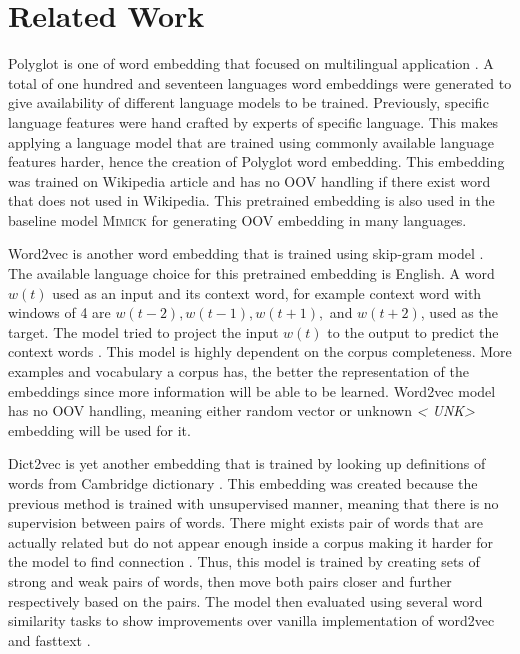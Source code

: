 \chapter{Related Work}
\label{chap:relatedwork}

Polyglot is one of word embedding that focused on multilingual
application \citep{polyglot2013alrfou}. A total of one hundred and
seventeen languages word embeddings were generated to give
availability of different language models to be trained. Previously,
specific language features were hand crafted by experts of specific
language\citep{polyglot2013alrfou}. This makes applying a language
model that are trained using commonly available language features
harder, hence the creation of Polyglot word embedding. This embedding
was trained on Wikipedia article and has no OOV handling if there
exist word that does not used in Wikipedia. This pretrained embedding
is also used in the baseline model \textsc{Mimick} for generating OOV
embedding in many languages.

Word2vec is another word embedding that is trained using skip-gram
model \citep{efficient2013mikolov}. The available language choice for
this pretrained embedding is English. A word $w(t)$ used as an input
and its context word, for example context word with windows of 4 are
$w(t-2), w(t-1), w(t+1),$ and $w(t+2)$, used as the target. The model
tried to project the input $w(t)$ to the output to predict the context
words \citep{efficient2013mikolov}. This model is highly dependent on
the corpus completeness. More examples and vocabulary a corpus has,
the better the representation of the embeddings since more information
will be able to be learned. Word2vec model has no OOV handling,
meaning either random vector or unknown \textit{\textless
UNK\textgreater} embedding will be used for it.

Dict2vec is yet another embedding that is trained by looking up
definitions of words from Cambridge dictionary
\citep{tissier2017dict2vec}. This embedding was created because the
previous method is trained with unsupervised manner, meaning that
there is no supervision between pairs of words. There might exists
pair of words that are actually related but do not appear enough
inside a corpus making it harder for the model to find connection
\citep{tissier2017dict2vec}. Thus, this model is trained by creating
sets of strong and weak pairs of words, then move both pairs closer
and further respectively based on the pairs. The model then evaluated
using several word similarity tasks to show improvements over vanilla
implementation of word2vec and fasttext \citep{tissier2017dict2vec}. 

